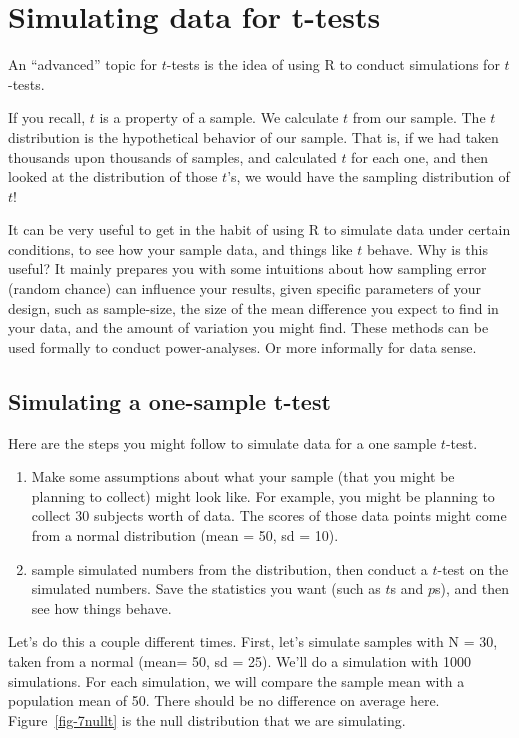\documentclass[
  letterpaper,
  DIV=11,
  numbers=noendperiod]{scrreprt}
\begin{document}
\section{Simulating data for t-tests}\label{simulating-data-for-t-tests}

An ``advanced'' topic for \(t\)-tests is the idea of using R to conduct
simulations for \(t\)-tests.

If you recall, \(t\) is a property of a sample. We calculate \(t\) from
our sample. The \(t\) distribution is the hypothetical behavior of our
sample. That is, if we had taken thousands upon thousands of samples,
and calculated \(t\) for each one, and then looked at the distribution
of those \(t\)'s, we would have the sampling distribution of \(t\)!

It can be very useful to get in the habit of using R to simulate data
under certain conditions, to see how your sample data, and things like
\(t\) behave. Why is this useful? It mainly prepares you with some
intuitions about how sampling error (random chance) can influence your
results, given specific parameters of your design, such as sample-size,
the size of the mean difference you expect to find in your data, and the
amount of variation you might find. These methods can be used formally
to conduct power-analyses. Or more informally for data sense.

\subsection{Simulating a one-sample
t-test}\label{simulating-a-one-sample-t-test}

Here are the steps you might follow to simulate data for a one sample
\(t\)-test.

\begin{enumerate}
\def\labelenumi{\arabic{enumi}.}
\item
  Make some assumptions about what your sample (that you might be
  planning to collect) might look like. For example, you might be
  planning to collect 30 subjects worth of data. The scores of those
  data points might come from a normal distribution (mean = 50, sd =
  10).
\item
  sample simulated numbers from the distribution, then conduct a
  \(t\)-test on the simulated numbers. Save the statistics you want
  (such as \(t\)s and \(p\)s), and then see how things behave.
\end{enumerate}

Let's do this a couple different times. First, let's simulate samples
with N = 30, taken from a normal (mean= 50, sd = 25). We'll do a
simulation with 1000 simulations. For each simulation, we will compare
the sample mean with a population mean of 50. There should be no
difference on average here. Figure~\ref{fig-7nullt} is the null
distribution that we are simulating.
\end{document}
